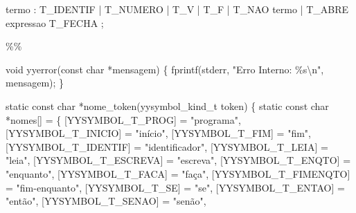 \documentclass[
  brazilian,
  letterpaper,
]{book}
\newenvironment{Shaded}{\begin{snugshade}}{\end{snugshade}}
\newcommand{\DataTypeTok}[1]{\textcolor[rgb]{0.68,0.00,0.00}{#1}}
\newcommand{\NormalTok}[1]{\textcolor[rgb]{0.00,0.23,0.31}{#1}}
\newcommand{\OperatorTok}[1]{\textcolor[rgb]{0.37,0.37,0.37}{#1}}
\newcommand{\SpecialCharTok}[1]{\textcolor[rgb]{0.37,0.37,0.37}{#1}}
\newcommand{\StringTok}[1]{\textcolor[rgb]{0.13,0.47,0.30}{#1}}
\theoremstyle{plain}
\theoremstyle{definition}
\theoremstyle{remark}
\begin{document}
\begin{Shaded}
\begin{Highlighting}[]
\NormalTok{termo}
    \OperatorTok{:}\NormalTok{ T\_IDENTIF}
    \OperatorTok{|}\NormalTok{ T\_NUMERO}
    \OperatorTok{|}\NormalTok{ T\_V}
    \OperatorTok{|}\NormalTok{ T\_F}
    \OperatorTok{|}\NormalTok{ T\_NAO termo}
    \OperatorTok{|}\NormalTok{ T\_ABRE expressao T\_FECHA}
    \OperatorTok{;} 

\OperatorTok{\%\%}

\DataTypeTok{void}\NormalTok{ yyerror}\OperatorTok{(}\DataTypeTok{const} \DataTypeTok{char} \OperatorTok{*}\NormalTok{mensagem}\OperatorTok{)}
\OperatorTok{\{}
\NormalTok{    fprintf}\OperatorTok{(}\NormalTok{stderr}\OperatorTok{,} \StringTok{"Erro Interno: }\SpecialCharTok{\%s\textbackslash{}n}\StringTok{"}\OperatorTok{,}\NormalTok{ mensagem}\OperatorTok{);}
\OperatorTok{\}}

\DataTypeTok{static} \DataTypeTok{const} \DataTypeTok{char} \OperatorTok{*}\NormalTok{nome\_token}\OperatorTok{(}\NormalTok{yysymbol\_kind\_t token}\OperatorTok{)}
\OperatorTok{\{}
    \DataTypeTok{static} \DataTypeTok{const} \DataTypeTok{char} \OperatorTok{*}\NormalTok{nomes}\OperatorTok{[]} \OperatorTok{=} \OperatorTok{\{}
        \OperatorTok{[}\NormalTok{YYSYMBOL\_T\_PROG}\OperatorTok{]}      \OperatorTok{=} \StringTok{"programa"}\OperatorTok{,}
        \OperatorTok{[}\NormalTok{YYSYMBOL\_T\_INICIO}\OperatorTok{]}    \OperatorTok{=} \StringTok{"início"}\OperatorTok{,}
        \OperatorTok{[}\NormalTok{YYSYMBOL\_T\_FIM}\OperatorTok{]}       \OperatorTok{=} \StringTok{"fim"}\OperatorTok{,}
        \OperatorTok{[}\NormalTok{YYSYMBOL\_T\_IDENTIF}\OperatorTok{]}   \OperatorTok{=} \StringTok{"identificador"}\OperatorTok{,}
        \OperatorTok{[}\NormalTok{YYSYMBOL\_T\_LEIA}\OperatorTok{]}      \OperatorTok{=} \StringTok{"leia"}\OperatorTok{,}
        \OperatorTok{[}\NormalTok{YYSYMBOL\_T\_ESCREVA}\OperatorTok{]}   \OperatorTok{=} \StringTok{"escreva"}\OperatorTok{,}
        \OperatorTok{[}\NormalTok{YYSYMBOL\_T\_ENQTO}\OperatorTok{]}     \OperatorTok{=} \StringTok{"enquanto"}\OperatorTok{,}
        \OperatorTok{[}\NormalTok{YYSYMBOL\_T\_FACA}\OperatorTok{]}      \OperatorTok{=} \StringTok{"faça"}\OperatorTok{,}
        \OperatorTok{[}\NormalTok{YYSYMBOL\_T\_FIMENQTO}\OperatorTok{]}  \OperatorTok{=} \StringTok{"fim{-}enquanto"}\OperatorTok{,}
        \OperatorTok{[}\NormalTok{YYSYMBOL\_T\_SE}\OperatorTok{]}        \OperatorTok{=} \StringTok{"se"}\OperatorTok{,}
        \OperatorTok{[}\NormalTok{YYSYMBOL\_T\_ENTAO}\OperatorTok{]}     \OperatorTok{=} \StringTok{"então"}\OperatorTok{,}
        \OperatorTok{[}\NormalTok{YYSYMBOL\_T\_SENAO}\OperatorTok{]}     \OperatorTok{=} \StringTok{"senão"}\OperatorTok{,}

\end{Highlighting}
\end{Shaded}
\end{document}

